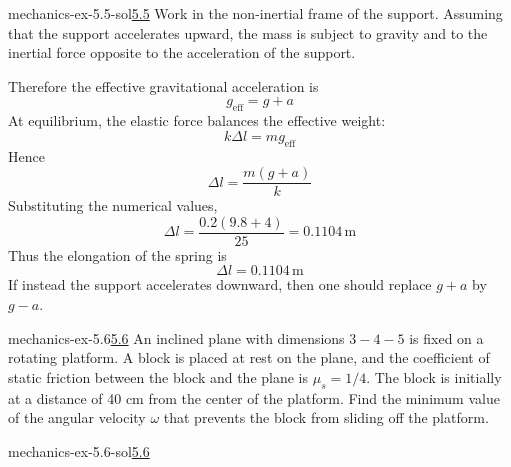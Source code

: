 \documentclass[preview]{standalone}
\begin{document}
\begin{snippetsolution}{mechanics-ex-5.5-sol}{\underline{5.5}}
    Work in the non-inertial frame of the support. Assuming that the support
    accelerates upward, the mass is subject to gravity and to the inertial force
    opposite to the acceleration of the support.

    Therefore the effective gravitational acceleration is
    \[
        g_{\mathrm{eff}} = g + a
    \]
    At equilibrium, the elastic force balances the effective weight:
    \[
        k\Delta l = mg_{\mathrm{eff}}
    \]
    Hence
    \[
        \Delta l = \frac{m(g+a)}{k}
    \]
    Substituting the numerical values,
    \[
        \Delta l
        =
        \frac{0.2(9.8+4)}{25}
        =
        0.1104 \, \text{m}
    \]
    Thus the elongation of the spring is
    \[
        \Delta l = 0.1104 \, \text{m}
    \]
    If instead the support accelerates downward, then one should replace
    \(g+a\) by \(g-a\).
\end{snippetsolution}

\begin{snippetexercise}{mechanics-ex-5.6}{\underline{5.6}}
    An inclined plane with dimensions \( 3-4-5 \) is fixed on a rotating platform. A block is placed at rest on the plane, and the coefficient of static friction between the block and the plane is \( \mu_s = 1/4 \). The block is initially at a distance of 40 cm from the center of the platform. Find the minimum value of the angular velocity \( \omega \) that prevents the block from sliding off the platform.
\end{snippetexercise}

\begin{snippetsolution}{mechanics-ex-5.6-sol}{\underline{5.6}}
    \todo
\end{snippetsolution}
\end{document}

